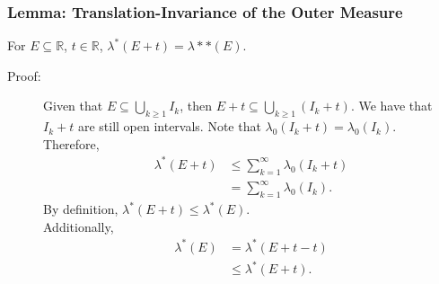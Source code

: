 \documentclass[9pt]{extarticle}
\newcommand{\R}{\mathbb{R}}
\begin{document}
  \subsubsection{Lemma: Translation-Invariance of the Outer Measure}%
  For $E\subseteq \R$, $t\in \R$, $\lambda^{\ast}(E + t) = \lambda*{\ast}(E)$.
  \begin{description}
    \item[Proof:] Given that $E\subseteq \bigcup_{k\geq 1} I_k$, then $E + t \subseteq \bigcup_{k\geq 1}(I_k + t)$. We have that $I_k + t$ are still open intervals. Note that $\lambda_{0}(I_k + t) = \lambda_0(I_k)$.\\

      Therefore,
      \begin{align*}
        \lambda^{\ast}(E + t) &\leq \sum_{k=1}^{\infty}\lambda_0(I_k + t)\\
                              &= \sum_{k=1}^{\infty}\lambda_0(I_k).
      \end{align*}
      By definition, $\lambda^{\ast}(E + t) \leq \lambda^{\ast}(E)$.\\

      Additionally,
      \begin{align*}
        \lambda^{\ast}(E) &= \lambda^{\ast}(E + t - t)\\
                          &\leq \lambda^{\ast}(E + t).
      \end{align*}
  \end{description}
\end{document}
